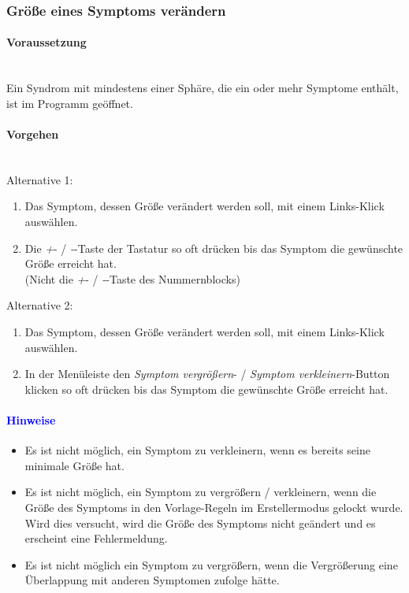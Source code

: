 \documentclass[enabledeprecatedfontcommands,fontsize=11pt,paper=a4,twoside]{scrartcl}
\newcommand*{\hint}{\paragraph{\textcolor{blue}{Hinweise}}}
\newcommand*{\condition}{\paragraph{Voraussetzung}$\;$ \vspace{0.2cm}\\}
\newcommand*{\actions}{\paragraph{Vorgehen} $\;$\vspace{0.2cm}\\}
\begin{document}
		\subsubsection{Größe eines Symptoms verändern}
					\condition 	
		Ein Syndrom mit mindestens einer Sphäre, die ein oder mehr Symptome enthält, ist im Programm geöffnet. 
		\actions
		Alternative 1:
		\begin{enumerate}
			\item Das Symptom, dessen Größe verändert werden soll, mit einem Links-Klick auswählen. 
			\item Die \glqq\textit{+}\grqq- / \glqq\textit{-}\grqq-Taste der Tastatur so oft drücken bis das Symptom die gewünschte Größe erreicht hat. \\
			(Nicht die  \glqq\textit{+}\grqq- / \glqq\textit{-}\grqq-Taste des Nummernblocks)
		\end{enumerate}
				Alternative 2:
		\begin{enumerate}
			\item Das Symptom, dessen Größe verändert werden soll, mit einem Links-Klick auswählen. 
			\item  In der Menüleiste den \textit{Symptom vergrößern}- / \textit{Symptom verkleinern}-Button klicken so oft drücken bis das Symptom die gewünschte Größe erreicht hat.
		\end{enumerate}
		\hint
		\begin{itemize}
			\item Es ist nicht möglich, ein Symptom zu verkleinern, wenn es bereits seine minimale Größe hat.
			\item Es ist nicht möglich, ein Symptom zu vergrößern  / verkleinern, wenn die Größe des Symptoms in den Vorlage-Regeln im Erstellermodus gelockt wurde. Wird dies versucht, wird die Größe des Symptoms nicht geändert und es erscheint eine Fehlermeldung.
			\item Es ist nicht möglich ein Symptom zu vergrößern, wenn die Vergrößerung eine Überlappung mit anderen Symptomen zufolge hätte.
		\end{itemize}
		
				\newpage	
\end{document}
